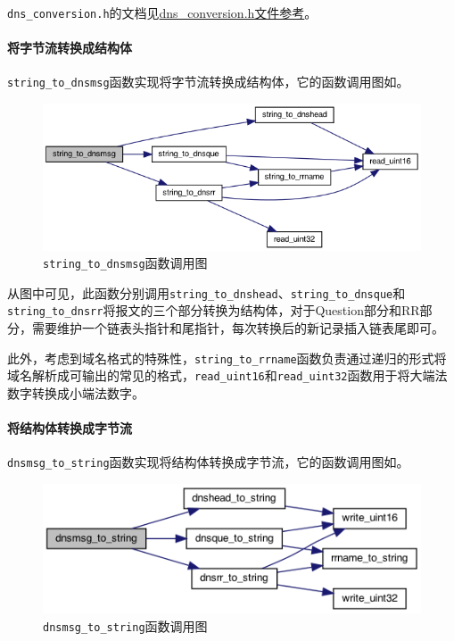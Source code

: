 \documentclass[lang=cn,11pt,a4paper,cite=authornum]{paper}
\begin{document}
\texttt{dns_conversion.h}的文档见\href{run:./APIdoc/dns__conversion_8h.html}{dns\_conversion.h文件参考}。

\paragraph{将字节流转换成结构体}

\texttt{string_to_dnsmsg}函数实现将字节流转换成结构体，它的函数调用图如。

\begin{figure}[htbp]

    \centering
    \includegraphics[width=0.8\linewidth]{./APIdoc/dns__conversion_8c_a0f89102e256c499ffa19784791cb68f6_cgraph.png}
    \caption{\texttt{string_to_dnsmsg}函数调用图\label{fig:string_to_dnsmsg_call}}

\end{figure}

从图中可见，此函数分别调用\texttt{string_to_dnshead}、\texttt{string_to_dnsque}和\texttt{string_to_dnsrr}将报文的三个部分转换为结构体，对于Question部分和RR部分，需要维护一个链表头指针和尾指针，每次转换后的新记录插入链表尾即可。

此外，考虑到域名格式的特殊性，\texttt{string_to_rrname}函数负责通过递归的形式将域名解析成可输出的常见的格式，\texttt{read_uint16}和\texttt{read_uint32}函数用于将大端法数字转换成小端法数字。

\paragraph{将结构体转换成字节流}

\texttt{dnsmsg_to_string}函数实现将结构体转换成字节流，它的函数调用图如。

\begin{figure}[htbp]

    \centering
    \includegraphics[width=0.7\linewidth]{./APIdoc/dns__conversion_8c_aa893e182a92c2ccf5644c1f8a12fba37_cgraph.png}
    \caption{\texttt{dnsmsg_to_string}函数调用图\label{fig:dnsmsg_to_string_call}}

\end{figure}
\end{document}
